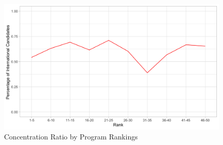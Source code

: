 \begin{figure}[H]
    \begin{center}
    \caption{Concentration Ratio by Program Rankings}
    \includegraphics[width=140mm, scale=0.5]{fig/figure2.png}
    \end{center}
	\label{fig:figure1}
    \vspace{0.3cm}
\end{figure}


